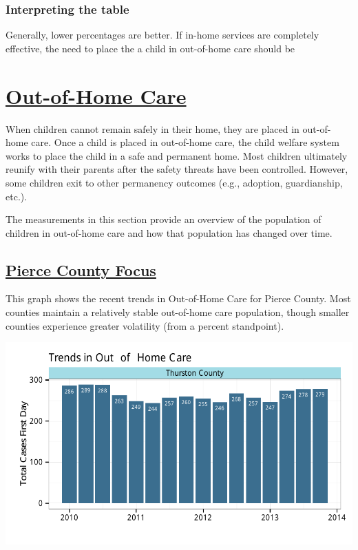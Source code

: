 \documentclass{article}\usepackage{graphicx, color}
\makeatletter
\def\maxwidth{ %
  \ifdim\Gin@nat@width>\linewidth
    \linewidth
  \else
    \Gin@nat@width
  \fi
}
\newenvironment{knitrout}{}{} %
\makeatother
\begin{document}
\subsubsection{Interpreting the table}
Generally, lower percentages are better. If in-home services are completely effective, the need to place the a child in out-of-home care should be 

\section{\href{http://www.partnersforourchildren.org/child-well-being/visualizations/out-home-care/trends}
    {Out-of-Home Care}
}
When children cannot remain safely in their home, they are placed in out-of-home care. Once a child is placed in out-of-home care, the child welfare system works to place the child in a safe and permanent home. Most children ultimately reunify with their parents after the safety threats have been controlled.
However, some children exit to other permanency outcomes (e.g., adoption, guardianship, etc.).

The measurements in this section provide an overview of the population of children in out-of-home care and how that population has changed over time.

\subsection{\href{http://www.partnersforourchildren.org/child-well-being/visualizations/out-home-care/trends}
{Pierce County Focus}
}
This graph shows the recent trends in Out-of-Home Care for
Pierce County. Most counties maintain a relatively stable out-of-home care population, though smaller counties experience greater volatility (from a percent standpoint).

\begin{knitrout}
\color{fgcolor}

{\centering \includegraphics[width=\maxwidth]{figure/ooh_focus} 

}



\end{knitrout}
\end{document}
